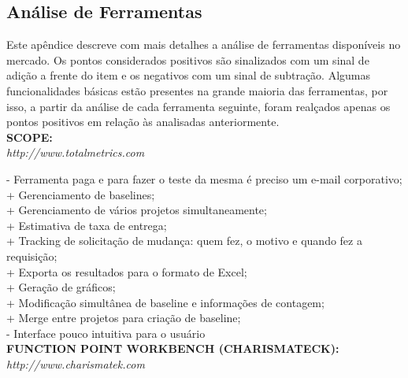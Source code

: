 \begin{apendicesenv}

\partapendices

\chapter{Análise de Ferramentas}

Este apêndice descreve com mais detalhes a análise de ferramentas disponíveis no mercado. Os pontos considerados positivos são sinalizados com um sinal de adição a frente do item e os negativos com um sinal de subtração. Algumas funcionalidades básicas estão presentes na grande maioria das ferramentas, por isso, a partir da análise de cada ferramenta seguinte, foram realçados apenas os pontos positivos em relação às analisadas anteriormente.\\


\noindent\textbf{SCOPE:}\\
\textit{http://www.totalmetrics.com}

\noindent- Ferramenta paga e para fazer o teste da mesma é preciso um e-mail corporativo;\\
+ Gerenciamento de baselines;\\
+ Gerenciamento de vários projetos simultaneamente;\\
+ Estimativa de taxa de entrega;\\
+ Tracking de solicitação de mudança: quem fez, o motivo e quando fez a  requisição;\\
+ Exporta os resultados para o formato de Excel;\\
+ Geração de gráficos;\\
+ Modificação simultânea de baseline e informações de contagem;\\
+ Merge entre projetos para criação de baseline;\\
- Interface pouco intuitiva para o usuário\\

\noindent\textbf{FUNCTION POINT WORKBENCH (CHARISMATECK):}\\
\textit{http://www.charismatek.com}


\end{apendicesenv}
